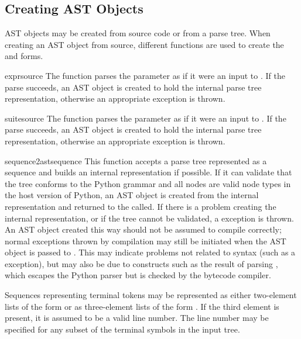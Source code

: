 \begin{seealso}
\end{seealso}


\subsection{Creating AST Objects \label{Creating ASTs}}

AST objects may be created from source code or from a parse tree.
When creating an AST object from source, different functions are used
to create the  and  forms.

\begin{funcdesc}{expr}{source}
The  function parses the parameter 
as if it were an input to .  If the parse succeeds, an AST object is created to hold the
internal parse tree representation, otherwise an appropriate exception
is thrown.
\end{funcdesc}

\begin{funcdesc}{suite}{source}
The  function parses the parameter 
as if it were an input to .  If the parse succeeds, an AST object is created to hold the
internal parse tree representation, otherwise an appropriate exception
is thrown.
\end{funcdesc}

\begin{funcdesc}{sequence2ast}{sequence}
This function accepts a parse tree represented as a sequence and
builds an internal representation if possible.  If it can validate
that the tree conforms to the Python grammar and all nodes are valid
node types in the host version of Python, an AST object is created
from the internal representation and returned to the called.  If there
is a problem creating the internal representation, or if the tree
cannot be validated, a  exception is thrown.  An AST
object created this way should not be assumed to compile correctly;
normal exceptions thrown by compilation may still be initiated when
the AST object is passed to .  This may indicate
problems not related to syntax (such as a 
exception), but may also be due to constructs such as the result of
parsing , which escapes the Python parser but is
checked by the bytecode compiler.

Sequences representing terminal tokens may be represented as either
two-element lists of the form  or as three-element
lists of the form .  If the third element is
present, it is assumed to be a valid line number.  The line number
may be specified for any subset of the terminal symbols in the input
tree.
\end{funcdesc}


